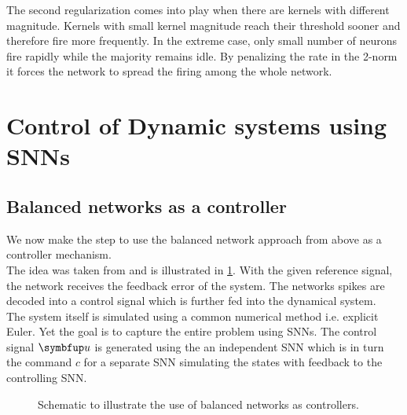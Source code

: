The second regularization comes into play when there are kernels with different magnitude. Kernels with small kernel magnitude reach their threshold sooner and therefore fire more frequently. In the extreme case, only small number of neurons fire rapidly while the majority remains idle. By penalizing the rate in the 2-norm it forces the network to spread the firing among the whole network.\\



\section{Control of Dynamic systems using \acp{SNN}}\label{sec:control}
\subsection{Balanced networks as a controller}
We now make the step to use the balanced network approach from above as a controller mechanism.\\
The idea was taken from \cite{huang_optimizing_2017} and is illustrated in \cref{fig:schematic}. With the given reference signal, the network receives the feedback error of the system. The networks spikes are decoded into a control signal which is further fed into the dynamical system.\\
The system itself is simulated using a common numerical method i.e. explicit Euler. Yet the goal is to capture the entire problem using \acp{SNN}. The control signal $\bmu{u}$ is generated using the an independent \ac{SNN} which is in turn the command $c$ for a separate \ac{SNN} simulating the states with feedback to the controlling \ac{SNN}.
\begin{figure}
	\centering
	\caption{Schematic to illustrate the use of balanced networks as controllers.}
	\label{fig:schematic}
\end{figure}
